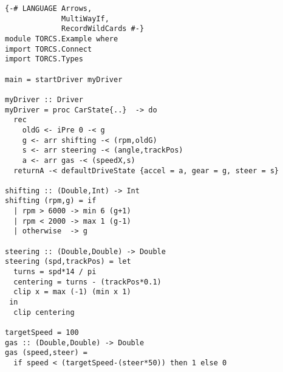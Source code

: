 \begin{lstlisting}[float,floatplacement=TR,caption=A complete basic controller in Yampa, label=lst:driver]
{-# LANGUAGE Arrows,
             MultiWayIf,
             RecordWildCards #-}
module TORCS.Example where
import TORCS.Connect
import TORCS.Types

main = startDriver myDriver

myDriver :: Driver
myDriver = proc CarState{..}  -> do
  rec 
    oldG <- iPre 0 -< g
    g <- arr shifting -< (rpm,oldG)
    s <- arr steering -< (angle,trackPos)
    a <- arr gas -< (speedX,s)
  returnA -< defaultDriveState {accel = a, gear = g, steer = s}

shifting :: (Double,Int) -> Int
shifting (rpm,g) = if 
  | rpm > 6000 -> min 6 (g+1)
  | rpm < 2000 -> max 1 (g-1)
  | otherwise  -> g
 
steering :: (Double,Double) -> Double
steering (spd,trackPos) = let
  turns = spd*14 / pi
  centering = turns - (trackPos*0.1)
  clip x = max (-1) (min x 1)
 in
  clip centering
  
targetSpeed = 100
gas :: (Double,Double) -> Double
gas (speed,steer) = 
  if speed < (targetSpeed-(steer*50)) then 1 else 0
\end{lstlisting}


